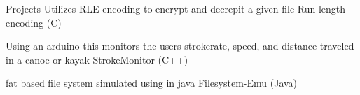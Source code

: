 \begin{cvsection}{Projects}
	\cventry
	{Utilizes RLE encoding to encrypt and decrepit a given file}
	{Run-length encoding (C)}{}{}{}

	\cventry
	{Using an arduino this monitors the users strokerate, speed, and distance traveled in a canoe or kayak}
	{StrokeMonitor (C++)}{}{}{}

	\cventry
	{fat based file system simulated using in java}
	{Filesystem-Emu (Java)}{}{}{}
\end{cvsection}
